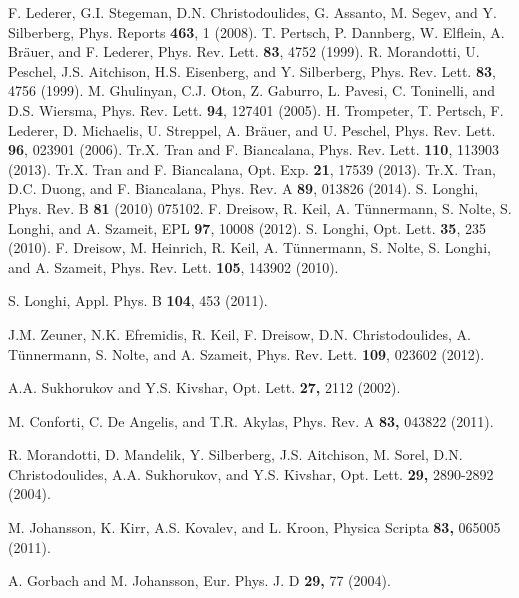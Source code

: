 \documentclass[twocolumn,aps, prl,showpacs]{revtex4}
\begin{document}
\begin{thebibliography}{99}

 F. Lederer, G.I. Stegeman, D.N. Christodoulides, G. Assanto, M. Segev, and Y. Silberberg, Phys. Reports {\bf 463}, 1 (2008).
 T. Pertsch, P. Dannberg, W. Elflein, A. Br\"{a}uer, and F. Lederer, Phys. Rev. Lett. {\bf 83}, 4752 (1999).
 R. Morandotti, U. Peschel, J.S. Aitchison, H.S. Eisenberg, and Y. Silberberg, Phys. Rev. Lett. {\bf 83}, 4756 (1999).
 M. Ghulinyan, C.J. Oton, Z. Gaburro, L. Pavesi, C. Toninelli, and D.S. Wiersma, Phys. Rev. Lett. {\bf 94}, 127401 (2005).
 H. Trompeter, T. Pertsch, F. Lederer, D. Michaelis, U. Streppel, A. Br\"{a}uer, and U. Peschel, Phys. Rev. Lett. {\bf 96}, 023901 (2006).
 Tr.X. Tran and F. Biancalana, Phys. Rev. Lett. {\bf 110}, 113903 (2013).
 Tr.X. Tran and F. Biancalana, Opt. Exp. {\bf 21}, 17539 (2013).
 Tr.X. Tran, D.C. Duong, and F. Biancalana, Phys. Rev. A {\bf 89}, 013826 (2014).
 S. Longhi, Phys. Rev. B {\bf 81} (2010) 075102.
 F. Dreisow, R. Keil, A. T\"{u}nnermann, S. Nolte, S. Longhi, and A. Szameit, EPL {\bf 97}, 10008 (2012).
 S. Longhi, Opt. Lett. {\bf 35}, 235 (2010).
 F. Dreisow, M. Heinrich, R. Keil, A. T\"{u}nnermann, S. Nolte, S. Longhi, and A. Szameit, Phys. Rev. Lett. {\bf 105}, 143902 (2010).

 S. Longhi, Appl. Phys. B {\bf 104}, 453 (2011).

 J.M. Zeuner, N.K. Efremidis, R. Keil, F. Dreisow, D.N. Christodoulides, A. T\"{u}nnermann, S. Nolte, and A.
        Szameit, Phys. Rev. Lett. {\bf 109}, 023602 (2012).

 A.A. Sukhorukov and Y.S. Kivshar, Opt. Lett. {\bf 27,} 2112 (2002).

 M. Conforti, C. De Angelis, and T.R. Akylas, Phys. Rev. A {\bf 83,} 043822 (2011).

 R. Morandotti, D. Mandelik, Y. Silberberg, J.S. Aitchison, M. Sorel, D.N. Christodoulides, A.A. Sukhorukov, and Y.S. Kivshar, Opt. Lett. {\bf 29,} 2890-2892 (2004).

 M. Johansson, K. Kirr, A.S. Kovalev, and L. Kroon, Physica Scripta {\bf 83,} 065005 (2011).

 A. Gorbach and M. Johansson, Eur. Phys. J. D {\bf 29,} 77 (2004).


\end{thebibliography}
\end{document}
